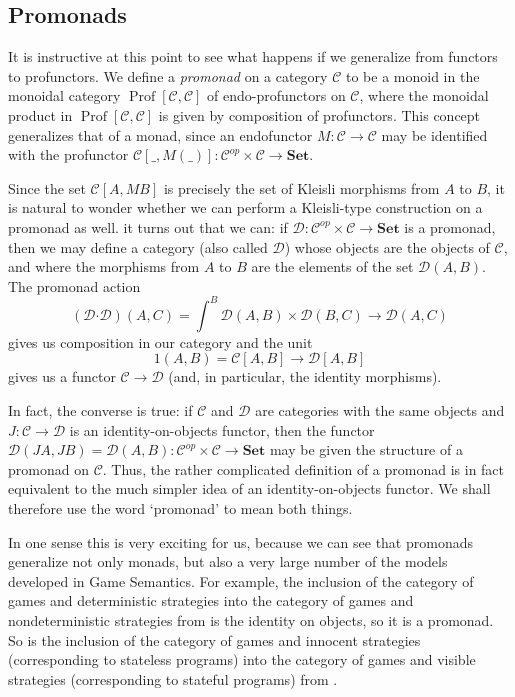 \documentclass{svproc}
\newcommand\C{\mathcal{C}}
\newcommand\D{\mathcal{D}}
\newcommand{\pfc}{\boldsymbol{\cdot}}
\newcommand*\from{\colon}
\newcommand{\0}{{\mathtt{0}}} \newcommand{\com}{{\mathtt{com}}}
\newcommand{\catname}[1]{\mathbf{#1}}
\newcommand{\Set}{\catname{Set}}
\DeclareMathOperator{\Prof}{Prof}
\begin{document}
\subsection{Promonads}

It is instructive at this point to see what happens if we generalize from functors to profunctors.  
We define a \emph{promonad} on a category $\C$ to be a monoid in the monoidal category $\Prof[\C,\C]$ of endo-profunctors on $\C$, where the monoidal product in $\Prof[\C,\C]$ is given by composition of profunctors.
This concept generalizes that of a monad, since an endofunctor $M\from \C\to\C$ may be identified with the profunctor $\C[\_,M(\_)]\from \C^{op}\times\C\to\Set$.

Since the set $\C[A,MB]$ is precisely the set of Kleisli morphisms from $A$ to $B$, it is natural to wonder whether we can perform a Kleisli-type construction on a promonad as well.  
it turns out that we can: if $\D\from \C^{op}\times\C\to\Set$ is a promonad, then we may define a category (also called $\D$) whose objects are the objects of $\C$, and where the morphisms from $A$ to $B$ are the elements of the set $\D(A,B)$.
The promonad action
\[
  (\D\pfc\D)(A,C) = \int^{B}\D(A,B)\times\D(B,C) \to \D(A,C)
  \]
gives us composition in our category and the unit
\[
  1(A,B)=\C[A,B]\to \D[A,B]
  \]
gives us a functor $\C\to\D$ (and, in particular, the identity morphisms).

In fact, the converse is true: if $\C$ and $\D$ are categories with the same objects and $J\from \C\to\D$ is an identity-on-objects functor, then the functor $\D(JA,JB)=\D(A,B)\from\C^{op}\times\C\to\Set$ may be given the structure of a promonad on $\C$.  
Thus, the rather complicated definition of a promonad is in fact equivalent to the much simpler idea of an identity-on-objects functor.
We shall therefore use the word `promonad' to mean both things.

In one sense this is very exciting for us, because we can see that promonads generalize not only monads, but also a very large number of the models developed in Game Semantics.  
For example, the inclusion of the category of games and deterministic strategies into the category of games and nondeterministic strategies from \cite{mcCHFiniteND} is the identity on objects, so it is a promonad.  
So is the inclusion of the category of games and innocent strategies (corresponding to stateless programs) into the category of games and visible strategies (corresponding to stateful programs) from \cite{SamsonGuyIAPassive}.
\end{document}

